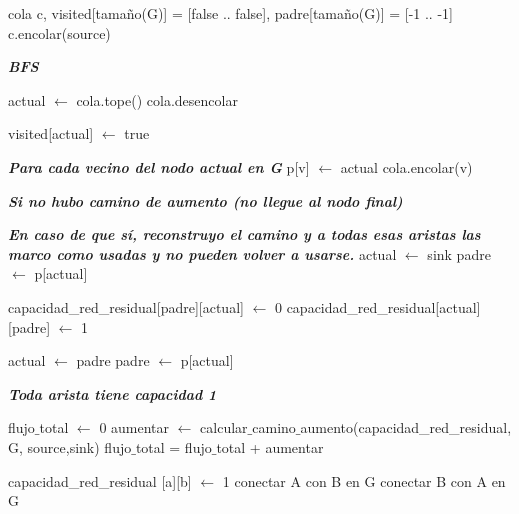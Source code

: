 \begin{algorithmic}
	\State cola c, visited[tamaño(G)] = [false .. false], padre[tamaño(G)] = [-1 .. -1]
	\State c.encolar(source)
	
	\State \textit{\textbf{BFS}}

		\State actual $\leftarrow$ cola.tope()
		\State cola.desencolar
		
		\State visited[actual] $\leftarrow$ true
		
		\State \textit{\textbf{Para cada vecino del nodo actual en G}}
					\State p[v] $\leftarrow$ actual
					\State cola.encolar(v)
				\EndIf
		\EndFor 
	\EndWhile

	\State \textit{\textbf{Si no hubo camino de aumento (no llegue al nodo final)}}
	\EndIf

	\State \textit{\textbf{En caso de que sí, reconstruyo el camino y a todas esas aristas las marco como usadas y no pueden volver a usarse.}}
	\State actual $\leftarrow$ sink
	\State padre $\leftarrow$ p[actual]
	
		\State capacidad_red_residual[padre][actual] $\leftarrow$ 0
		\State capacidad_red_residual[actual][padre] $\leftarrow$ 1
		
		\State actual $\leftarrow$ padre
		\State padre $\leftarrow$ p[actual]
	\EndWhile

	\State \textit{\textbf{Toda arista tiene capacidad 1 \\}}
\EndFunction
\end{algorithmic}
\hspace{1cm}

\begin{algorithmic}
	\State flujo$\_$total $\leftarrow$ 0
	\Repeat 
			\State aumentar $\leftarrow$ calcular$\_$camino$\_$aumento(capacidad_red_residual, G, source,sink)
			\State flujo$\_$total = flujo$\_$total + aumentar
	
\EndFunction
\end{algorithmic}
\hspace{1cm}

\begin{algorithmic}
	\State capacidad_red_residual [a][b] $\leftarrow$ 1
	\State conectar A con B en G
	\State conectar B con A en G
\EndFunction
\end{algorithmic}
\hspace{1cm}


